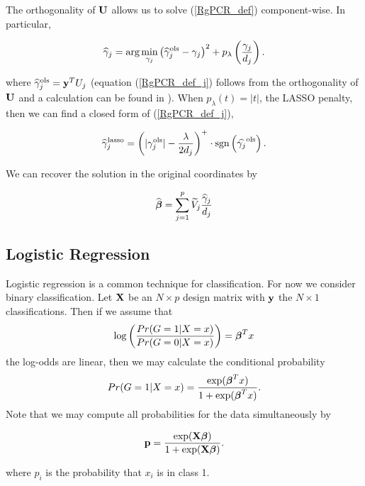 \documentclass[main.tex]{subfiles}
\begin{document}
The orthogonality of $\mathbf{U}$ allows us to solve (\ref{RgPCR_def}) component-wise. In particular,

\begin{align}
    \widehat{\gamma}_j = \text{arg} \min_{\gamma_j}  \left ( \widehat{\gamma}^{\text{ols}}_j - \gamma_j \right )^2 + p_\lambda \left ( \frac{\gamma_j}{d_j} \right ).  \label{RgPCR_def_j}
\end{align}

where $\widehat{\gamma}^{\text{ols}}_j = \mathbf{y}^T U_j$ (equation (\ref{RgPCR_def_j}) follows from the orthogonality of $\mathbf{U}$ and a calculation can be found in \cite{langzou}). When $p_{\lambda}(t) = |t|$, the LASSO penalty, then we can find a closed form of (\ref{RgPCR_def_j}),

\begin{align}
	\widehat{\gamma}_j^{\text{lasso}} = \left ( |\gamma_j^{\text{ols}}| - \frac{\lambda}{2d_j} \right )^+ \cdot \text{sgn} \left ( \widehat{\gamma_j}^{\text{ols}} \right ).
\end{align}

We can recover the solution in the original coordinates by

\begin{align}
	\widehat{\boldsymbol \beta} = \sum_{j = 1}^p \widetilde{V}_j \frac{\widehat{\gamma}_j}{d_j}
\end{align}

\subsection{Logistic Regression}
Logistic regression is a common technique for classification. For now we consider binary classification. Let $\mathbf{X}$ be an $N \times p$ design matrix with $\mathbf{y}$ the $N \times 1$ classifications. Then if we assume that
\begin{align}
    \log \left ( \dfrac{Pr(G = 1 | X = x)}{Pr(G = 0|X = x)}\right ) = \boldsymbol \beta^Tx \label{log-odds}
\end{align}
the log-odds are linear, then we may calculate the conditional probability
\begin{align}
    Pr(G = 1 | X = x) = \dfrac{\text{exp}(\boldsymbol \beta^Tx)}{1 + \text{exp}(\boldsymbol \beta^Tx)}.
\end{align}
Note that we may compute all probabilities for the data simultaneously by

\begin{align}
	\mathbf{p} = \dfrac{\text{exp}(\mathbf{X} \boldsymbol \beta)}{1 + \text{exp}(\mathbf{X} \boldsymbol \beta)}.
\end{align}

where $p_i$ is the probability that $x_i$ is in class 1.
\end{document}
